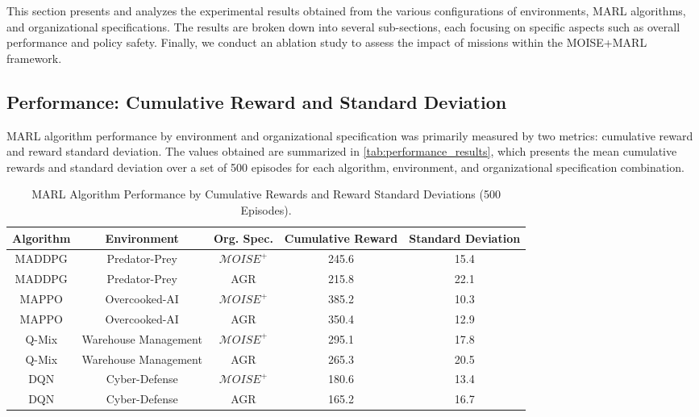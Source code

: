 \documentclass[sigconf,anonymous]{aamas}
\begin{document}
This section presents and analyzes the experimental results obtained from the various configurations of environments, MARL algorithms, and organizational specifications. The results are broken down into several sub-sections, each focusing on specific aspects such as overall performance and policy safety. Finally, we conduct an ablation study to assess the impact of missions within the MOISE+MARL framework.

\subsection{Performance: Cumulative Reward and Standard Deviation}

MARL algorithm performance by environment and organizational specification was primarily measured by two metrics: cumulative reward and reward standard deviation. The values obtained are summarized in \autoref{tab:performance_results}, which presents the mean cumulative rewards and standard deviation over a set of 500 episodes for each algorithm, environment, and organizational specification combination.

\begin{table*}[h!]
    \centering
    \caption{MARL Algorithm Performance by Cumulative Rewards and Reward Standard Deviations (500 Episodes).}
    \label{tab:performance_results}
    \begin{tabular}{|c|c|c|c|c|}
        \hline
        \textbf{Algorithm} & \textbf{Environment} & \textbf{Org. Spec.} & \textbf{Cumulative Reward} & \textbf{Standard Deviation} \\ \hline
        MADDPG & Predator-Prey & $\mathcal{M}OISE^+$ & 245.6 & 15.4 \\ \hline
        MADDPG & Predator-Prey & AGR & 215.8 & 22.1 \\ \hline
        MAPPO & Overcooked-AI & $\mathcal{M}OISE^+$ & 385.2 & 10.3 \\ \hline
        MAPPO & Overcooked-AI & AGR & 350.4 & 12.9 \\ \hline
        Q-Mix & Warehouse Management & $\mathcal{M}OISE^+$ & 295.1 & 17.8 \\ \hline
        Q-Mix & Warehouse Management & AGR & 265.3 & 20.5 \\ \hline
        DQN & Cyber-Defense & $\mathcal{M}OISE^+$ & 180.6 & 13.4 \\ \hline
        DQN & Cyber-Defense & AGR & 165.2 & 16.7 \\ \hline
    \end{tabular}
\end{table*}
\end{document}
